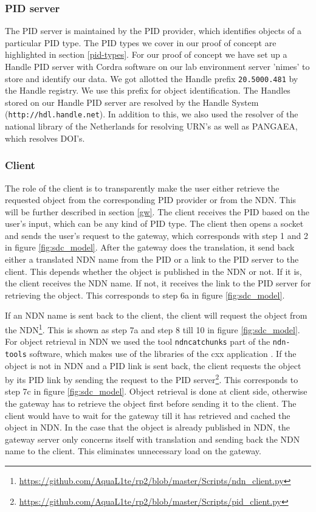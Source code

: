 \subsubsection{PID server}
The PID server is maintained by the PID provider, which identifies objects of a particular PID type. The PID types we cover in our proof of concept are highlighted in section \ref{pid-types}. For our proof of concept we have set up a Handle PID server with Cordra software \cite{cor} on our lab environment server 'nimes' to store and identify our data. We got allotted the Handle prefix \texttt{20.5000.481} by the Handle registry. We use this prefix for object identification. The Handles stored on our Handle PID server are resolved by the Handle System (\texttt{http://hdl.handle.net}). In addition to this, we also used the resolver of the national library of the Netherlands for resolving URN's as well as PANGAEA, which resolves DOI's. 

\subsubsection{Client}\label{client}
The role of the client is to transparently make the user either retrieve the requested object from the corresponding PID provider or from the NDN. This will be further described in section \ref{gw}. The client receives the PID based on the user's input, which can be any kind of PID type. The client then opens a socket and sends the user's request to the gateway, which corresponds with step 1 and 2 in figure \ref{fig:sdc_model}. After the gateway does the translation, it send back either a translated NDN name from the PID or a link to the PID server to the client. This depends whether the object is published in the NDN or not. If it is, the client receives the NDN name. If not, it receives the link to the PID server for retrieving the object. This corresponds to step 6a in figure \ref{fig:sdc_model}.

If an NDN name is sent back to the client, the client will request the object from the NDN\footnote{\url{https://github.com/AquaL1te/rp2/blob/master/Scripts/ndn_client.py}}. This is shown as step 7a and step 8 till 10 in figure \ref{fig:sdc_model}. For object retrieval in NDN we used the tool \texttt{ndncatchunks} part of the \texttt{ndn-tools} software, which makes use of the libraries of the \gls{cxx} application \cite{ndn-tools}. 
If the object is not in NDN and a PID link is sent back, the client requests the object by its PID link by sending the request to the PID server\footnote{\url{https://github.com/AquaL1te/rp2/blob/master/Scripts/pid_client.py}}. This corresponds to step 7c in figure \ref{fig:sdc_model}. Object retrieval is done at client side, otherwise the gateway has to retrieve the object first before sending it to the client. 
The client would have to wait for the gateway till it has retrieved and cached the object in NDN. 
In the case that the object is already published in NDN, the gateway server only concerns itself with translation and sending back the NDN name to the client. This eliminates unnecessary load on the gateway.

